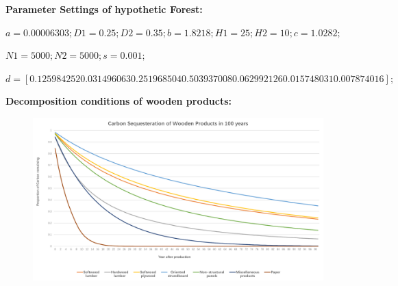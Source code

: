 \documentclass{mcmthesis}
\numberwithin{figure}{section}
\numberwithin{table}{section}
\numberwithin{equation}{section}
\begin{document}





\lhead{\small\sffamily \team}

\newpage

\begin{appendices}

\textbf{Parameter Settings of hypothetic Forest:}

$ a=0.00006303;
D1=0.25;
D2=0.35;
b=1.8218;
H1=25;
H2=10;
c=1.0282;$

$
N1=5000;
N2=5000;
s=0.001;%
$

$
d=[0.125984252 0.031496063 0.251968504 0.503937008 0.062992126 0.015748031 
0.007874016];
 $ 
 \par

 \textbf{Decomposition conditions of wooden products:}
\begin{figure}[htbp]
  \centering
  \includegraphics[width = 14cm]{code&pic/产品腐败数据.pdf}
\end{figure}


\end{appendices}
\end{document}
